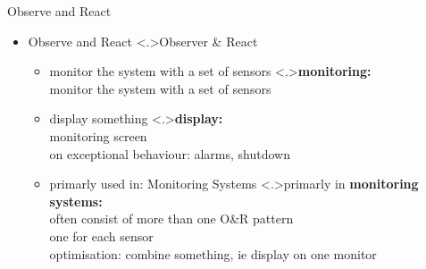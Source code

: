 \documentclass[ngerman={babel}, utf8, bigger, t, xcolor={table,dvipsnames}, ompress, hyperref={bookmarks,colorlinks},red]{beamer}
\begin{document}
\begin{frame}{Observe and React}
	\begin{itemize}
		\item Observe and React
		\note<.>{Observer \& React}
		\begin{itemize}
			\item monitor the system with a set of sensors
			\note<.>{\textbf{monitoring:}\\ monitor the system with a set of sensors}
			\item display something
			\note<.>{\textbf{display:}\\ monitoring screen \\ on exceptional behaviour: alarms, shutdown\\ }
			\item primarly used in: Monitoring Systems
			\note<.>{primarly in \textbf{monitoring systems:}\\ often consist of more than one O\&R pattern \\ one for each sensor \\ optimisation: combine something, ie display on one monitor}
		\end{itemize}
	\end{itemize}
\end{frame}
\end{document}

